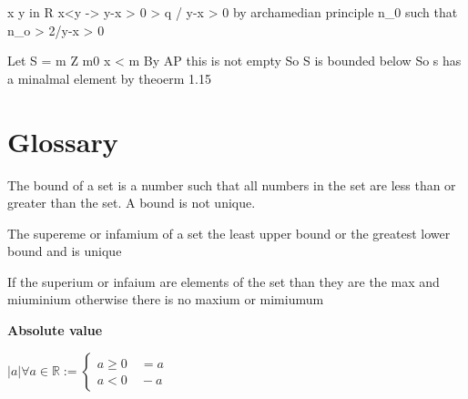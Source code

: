 \documentclass{tufte-book}
\providecommand{\tightlist}{%
  \setlength{\itemsep}{0pt}\setlength{\parskip}{0pt}}
\begin{document}
x y in R x\textless{}y -\textgreater{} y-x \textgreater{} 0
\textgreater{} q / y-x \textgreater{} 0 by archamedian principle
\eixts n\_0 \in {} such that n\_o \textgreater{} 2/y-x
\textgreater{} 0

Let S = m \in Z m0 x \textless{} m By AP this is not empty So S is
bounded below So s has a minalmal element by theoerm 1.15\hypertarget{glossary}{%
\section{Glossary}\label{glossary}}

\begin{description}
\tightlist
\item[Bound]
The bound of a set is a number such that all numbers in the set are less
than or greater than the set. A bound is not unique.
\item[Supremum]
The supereme or infamium of a set the least upper bound or the greatest
lower bound and is unique
\item[Maximum and miniumium]
If the superium or infaium are elements of the set than they are the max
and miuminium otherwise there is no maxium or mimiumum
\end{description}\textbf{Absolute value}

\(|a| \forall a \in \mathbb{R} := \begin{cases} a \geq 0 \quad = a \\ a < 0 \quad -a \end{cases}\)
\end{document}
